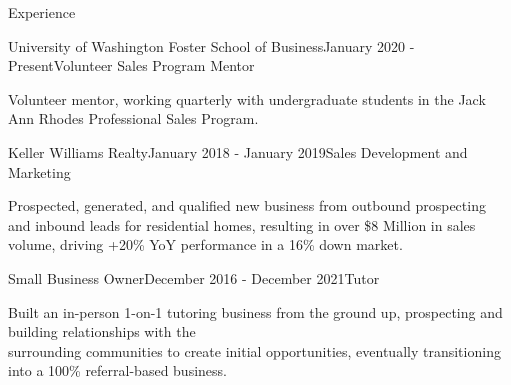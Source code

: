 \documentclass[
	11pt, %
]{resume} %
\begin{document}
\begin{rSection}{Experience}


        \begin{rSubsection}{University of Washington Foster School of 
        Business}{January 2020 - Present}{Volunteer Sales Program Mentor}{}
            \item Volunteer mentor, working quarterly with undergraduate students in the Jack Ann Rhodes Professional Sales Program.
        
            
        \end{rSubsection}
        
	\begin{rSubsection}{Keller Williams Realty}{January 2018 - January 2019}{Sales Development and Marketing}{}
		\item Prospected, generated, and qualified new business from outbound prospecting and inbound leads for residential homes, resulting in over \$8 Million in sales volume, driving +20\% YoY performance in a 16\% down market.
		
	\end{rSubsection}

        \begin{rSubsection}{Small Business Owner}{December 2016 - December 2021}{Tutor}{}
            \item Built an in-person 1-on-1 tutoring business from the ground up, prospecting and building relationships with the \\surrounding communities to create initial opportunities, eventually transitioning into a 100\% referral-based business.
           

\end{rSubsection}
\end{rSection}
\end{document}
